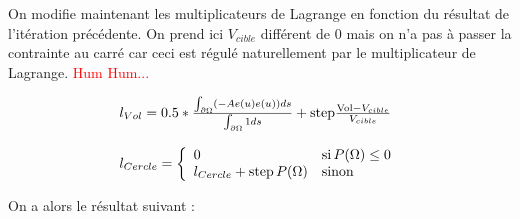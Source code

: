 \documentclass[11pt,a4paper]{article}
\begin{document}
On modifie maintenant les multiplicateurs de Lagrange en fonction du résultat de l'itération précédente. On prend ici $V_{cible}$ différent de 0 mais on n'a pas à passer la contrainte au carré car ceci est régulé naturellement par le multiplicateur de Lagrange. \textcolor{red}{Hum Hum...}

\begin{equation}
\begin{array}{l}
l_{Vol}=0.5*\frac{\int_{\partial\Omega}(-Ae(u)e(u))ds}{\int_{\partial\Omega}1ds}+\textrm{step}\frac{\textrm{Vol}-V_{cible}}{V_{cible}} \\
\\
l_{Cercle}=\left\{\begin{array}{ll}
0 & \textrm{si\,}P(\Omega)\leq 0 \\
l_{Cercle}+\textrm{step\,}P(\Omega) & \textrm{sinon}
\end{array}\right.
\end{array}
\end{equation}


On a alors le résultat suivant :
\end{document}

